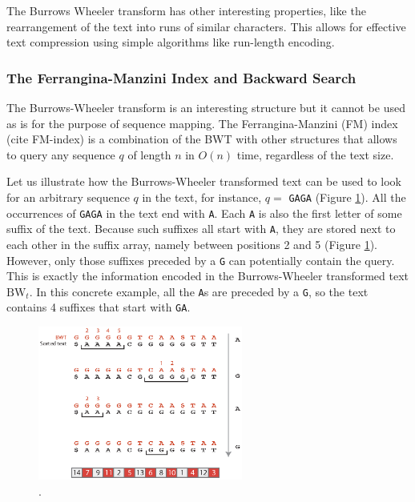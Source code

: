 The Burrows Wheeler transform has other interesting properties, like
the rearrangement of the text into runs of similar characters. This
allows for effective text compression using simple algorithms like
run-length encoding.

\subsubsection{The Ferrangina-Manzini Index and Backward Search}

The Burrows-Wheeler transform is an interesting structure but it
cannot be used as is for the purpose of sequence mapping. The
Ferrangina-Manzini (FM) index (cite FM-index) is a combination of the
BWT with other structures that allows to query any sequence $q$ of
length $n$ in $O(n)$ time, regardless of the text size. 

Let us illustrate how the Burrows-Wheeler transformed text can be used
to look for an arbitrary sequence $q$ in the text, for instance, $q =$
\texttt{GAGA} (Figure \ref{fig:chap2:backward_search}). All the
occurrences of \texttt{GAGA} in the text end with \texttt{A}. Each
\texttt{A} is also the first letter of some suffix of the
text. Because such suffixes all start with \texttt{A}, they are stored
next to each other in the suffix array, namely between positions 2 and
5 (Figure \ref{fig:chap2:backward_search}). However, only those
suffixes preceded by a \texttt{G} can potentially contain the
query. This is exactly the information encoded in the Burrows-Wheeler
transformed text $\mbox{BW}_t$. In this concrete example, all the
\texttt{A}s are preceded by a \texttt{G}, so the text contains 4
suffixes that start with \texttt{GA}.

\begin{figure}[h]
	\begin{minipage}[b]{\linewidth}
	  \centering
	  \includegraphics*[width=0.6\textwidth]{figures/chap2_backward_search}
	  \caption{.}
	  \label{fig:chap2:backward_search}
   \end{minipage}
\end{figure}

